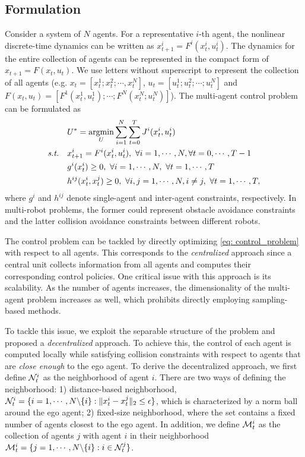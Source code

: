 \documentclass[twoside,11pt]{article}
\begin{document}
\subsection{Formulation}
\label{sec: dist_sampling_derivation}
Consider a system of $N$ agents. For a representative $i$-th agent, the nonlinear discrete-time dynamics can be written as $x^i_{t+1} = F^i(x^i_t, u^i_t)$. 
The dynamics for the entire collection of agents can be represented in the compact form of $x_{t+1} = F(x_t, u_t)$.  We use letters without superscript to represent the collection of all agents (e.g. $x_t=[x^1_t; x^2_t; \cdots, x^N_t]$, $u_t=[u^1_t; u^2_t; \cdots; u^N_t]$ and $F(x_t, u_t)=[F^1(x^1_t, u^1_t); \cdots; F^N(x^N_t; u^N_t)]$).  
The multi-agent control problem can be formulated as
\begin{equation}
\begin{split} \label{eq: control_problem}
& U^* = \argmin_U \sum_{i=1}^N \sum_{t=0}^T J^i(x^i_t, u^i_t)\\
\textit{s.t.} \quad & x^i_{t+1} = F^i(x^i_t, u^i_t), \ \forall i=1,\cdots, N, \forall t = 0,\cdots,T-1\\
& g^i(x^i_t)\geq 0, \ \forall i=1,\cdots,N, \ \forall t = 1,\cdots,T \\
& h^{ij}(x^i_t, x^j_t) \geq 0, \ \forall i,j=1,\cdots,N, i\neq j, \ \forall t = 1,\cdots,T,
\end{split}
\end{equation}
where $g^i$ and $h^{ij}$ denote single-agent and inter-agent constraints, respectively. In multi-robot problems, the former could represent obstacle avoidance constraints and the latter collision avoidance constraints between different robots.

The control problem can be tackled by directly optimizing \eqref{eq: control_problem} with respect to all agents. This corresponds to the \textit{centralized} approach since a central unit collects information from all agents and computes their corresponding control policies. One critical issue with this approach is its scalability. As the number of agents increases, the dimensionality of the multi-agent problem increases as well, which prohibits directly employing sampling-based methods.  

To tackle this issue, we exploit the separable structure of the problem and proposed a \textit{decentralized} approach. To achieve this, the control of each agent is computed locally while satisfying collision constraints with respect to agents that are \textit{close enough} to the ego agent. To derive the decentralized approach, we first define ${\cal N}^i_t$ as the neighborhood of agent $i$. There are two ways of defining the neighborhood: 1) distance-based neighborhood, ${\cal N}^i_t=\{i=1,\cdots,N\backslash \{i\} : \|x^i_t-x^j_t\|_2\leq \epsilon\}$, which is characterized by a norm ball around the ego agent; 2) fixed-size neighborhood, where the set contains a fixed number of agents closest to the ego agent. In addition, we define ${\cal M}^i_t$ as the collection of agents $j$ with agent $i$ in their neighborhood ${\cal M}^i_t=\{j=1,\cdots,N\backslash \{i\} : i\in{\cal N}^j_t\}$. 
\end{document}
